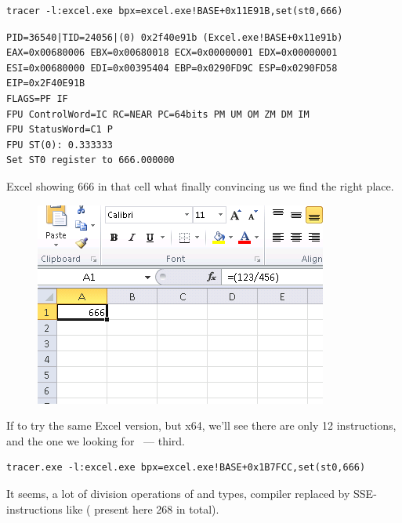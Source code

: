 \begin{lstlisting}
tracer -l:excel.exe bpx=excel.exe!BASE+0x11E91B,set(st0,666)
\end{lstlisting}

\begin{lstlisting}
PID=36540|TID=24056|(0) 0x2f40e91b (Excel.exe!BASE+0x11e91b)
EAX=0x00680006 EBX=0x00680018 ECX=0x00000001 EDX=0x00000001
ESI=0x00680000 EDI=0x00395404 EBP=0x0290FD9C ESP=0x0290FD58
EIP=0x2F40E91B
FLAGS=PF IF
FPU ControlWord=IC RC=NEAR PC=64bits PM UM OM ZM DM IM 
FPU StatusWord=C1 P 
FPU ST(0): 0.333333
Set ST0 register to 666.000000
\end{lstlisting}

{Excel showing 666 in that cell what finally convincing us we find the right place.}

\begin{figure}[ht!]
\centering
\includegraphics[scale=0.66]{digging_into_code/Excel_prank.png}
\caption{}
\end{figure}

{If to try the same Excel version, but x64, we'll see there are only 12 \FDIV instructions,
and the one we looking for ~--- third.}

\begin{lstlisting}
tracer.exe -l:excel.exe bpx=excel.exe!BASE+0x1B7FCC,set(st0,666)
\end{lstlisting}

{It seems, a lot of division operations of \Tfloat and \Tdouble types, compiler replaced by SSE-instructions
like  ( present here 268 in total).}

